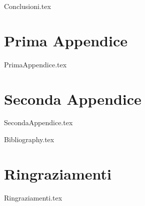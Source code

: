 \documentclass[12pt,a4paper,openright,twoside]{report}
\begin{document}
{Conclusioni.tex}

\chapter{Prima Appendice}

{PrimaAppendice.tex}

\chapter{Seconda Appendice}

{SecondaAppendice.tex}


{Bibliography.tex}

\clearpage{\pagestyle{empty}\cleardoublepage}

\chapter*{Ringraziamenti}

{Ringraziamenti.tex}
\end{document}
